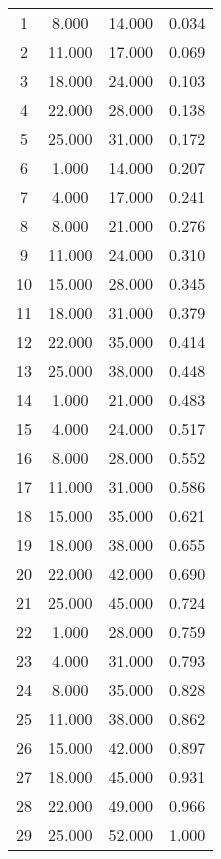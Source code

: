 % 
\begin{tabular}{cccc}
  \hline
  \hline
1 & 8.000 & 14.000 & 0.034 \\ 
  2 & 11.000 & 17.000 & 0.069 \\ 
  3 & 18.000 & 24.000 & 0.103 \\ 
  4 & 22.000 & 28.000 & 0.138 \\ 
  5 & 25.000 & 31.000 & 0.172 \\ 
  6 & 1.000 & 14.000 & 0.207 \\ 
  7 & 4.000 & 17.000 & 0.241 \\ 
  8 & 8.000 & 21.000 & 0.276 \\ 
  9 & 11.000 & 24.000 & 0.310 \\ 
  10 & 15.000 & 28.000 & 0.345 \\ 
  11 & 18.000 & 31.000 & 0.379 \\ 
  12 & 22.000 & 35.000 & 0.414 \\ 
  13 & 25.000 & 38.000 & 0.448 \\ 
  14 & 1.000 & 21.000 & 0.483 \\ 
  15 & 4.000 & 24.000 & 0.517 \\ 
  16 & 8.000 & 28.000 & 0.552 \\ 
  17 & 11.000 & 31.000 & 0.586 \\ 
  18 & 15.000 & 35.000 & 0.621 \\ 
  19 & 18.000 & 38.000 & 0.655 \\ 
  20 & 22.000 & 42.000 & 0.690 \\ 
  21 & 25.000 & 45.000 & 0.724 \\ 
  22 & 1.000 & 28.000 & 0.759 \\ 
  23 & 4.000 & 31.000 & 0.793 \\ 
  24 & 8.000 & 35.000 & 0.828 \\ 
  25 & 11.000 & 38.000 & 0.862 \\ 
  26 & 15.000 & 42.000 & 0.897 \\ 
  27 & 18.000 & 45.000 & 0.931 \\ 
  28 & 22.000 & 49.000 & 0.966 \\ 
  29 & 25.000 & 52.000 & 1.000 \\ 
   \hline
\end{tabular}
